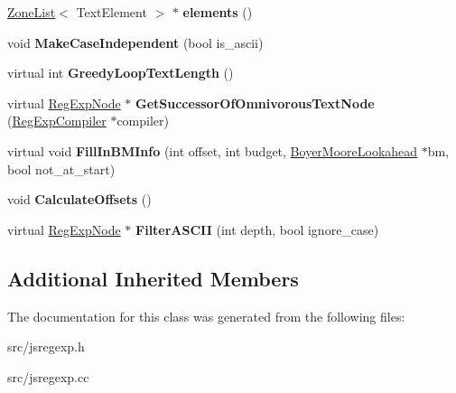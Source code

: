 \begin{DoxyCompactItemize}
\item 
\hypertarget{classv8_1_1internal_1_1_text_node_adaf2c35d3b69231b4bbb700f87ff0eb4}{}\hyperlink{classv8_1_1internal_1_1_zone_list}{Zone\+List}$<$ Text\+Element $>$ $\ast$ {\bfseries elements} ()\label{classv8_1_1internal_1_1_text_node_adaf2c35d3b69231b4bbb700f87ff0eb4}

\item 
\hypertarget{classv8_1_1internal_1_1_text_node_a9eaf78b856e329bd8cdf0ded4a3a2ee1}{}void {\bfseries Make\+Case\+Independent} (bool is\+\_\+ascii)\label{classv8_1_1internal_1_1_text_node_a9eaf78b856e329bd8cdf0ded4a3a2ee1}

\item 
\hypertarget{classv8_1_1internal_1_1_text_node_a104f743988dbe90dc16dcf4a192645d5}{}virtual int {\bfseries Greedy\+Loop\+Text\+Length} ()\label{classv8_1_1internal_1_1_text_node_a104f743988dbe90dc16dcf4a192645d5}

\item 
\hypertarget{classv8_1_1internal_1_1_text_node_a134934f721860833acc1d0b5b60c9d49}{}virtual \hyperlink{classv8_1_1internal_1_1_reg_exp_node}{Reg\+Exp\+Node} $\ast$ {\bfseries Get\+Successor\+Of\+Omnivorous\+Text\+Node} (\hyperlink{classv8_1_1internal_1_1_reg_exp_compiler}{Reg\+Exp\+Compiler} $\ast$compiler)\label{classv8_1_1internal_1_1_text_node_a134934f721860833acc1d0b5b60c9d49}

\item 
\hypertarget{classv8_1_1internal_1_1_text_node_a15f7f3bd0230e5950e119e3cbb7aa291}{}virtual void {\bfseries Fill\+In\+B\+M\+Info} (int offset, int budget, \hyperlink{classv8_1_1internal_1_1_boyer_moore_lookahead}{Boyer\+Moore\+Lookahead} $\ast$bm, bool not\+\_\+at\+\_\+start)\label{classv8_1_1internal_1_1_text_node_a15f7f3bd0230e5950e119e3cbb7aa291}

\item 
\hypertarget{classv8_1_1internal_1_1_text_node_a12a59535555258c7ef5415d28e6bc152}{}void {\bfseries Calculate\+Offsets} ()\label{classv8_1_1internal_1_1_text_node_a12a59535555258c7ef5415d28e6bc152}

\item 
\hypertarget{classv8_1_1internal_1_1_text_node_a17bda8aefc2a6014a35b207b3e2b135e}{}virtual \hyperlink{classv8_1_1internal_1_1_reg_exp_node}{Reg\+Exp\+Node} $\ast$ {\bfseries Filter\+A\+S\+C\+I\+I} (int depth, bool ignore\+\_\+case)\label{classv8_1_1internal_1_1_text_node_a17bda8aefc2a6014a35b207b3e2b135e}

\end{DoxyCompactItemize}
\subsection*{Additional Inherited Members}


The documentation for this class was generated from the following files\+:\begin{DoxyCompactItemize}
\item 
src/jsregexp.\+h\item 
src/jsregexp.\+cc\end{DoxyCompactItemize}

